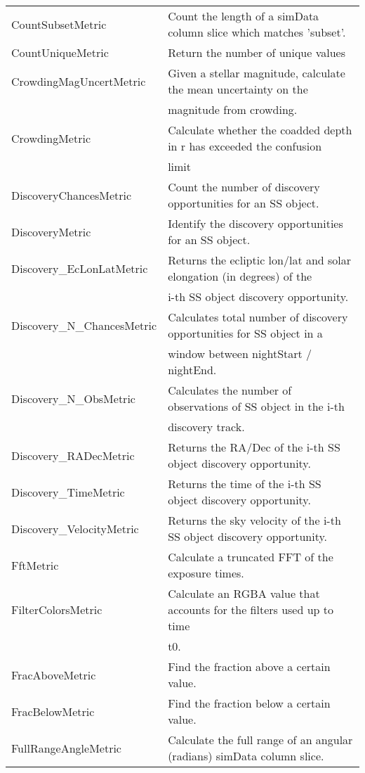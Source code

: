 \begin{table}
\begin{tabular}{ll}
 CountSubsetMetric &  Count the length of a simData column slice which matches 'subset'. \\
 CountUniqueMetric &  Return the number of unique values \\
 CrowdingMagUncertMetric &  Given a stellar magnitude, calculate the mean uncertainty on the \\
  &  magnitude from crowding. \\
 CrowdingMetric &  Calculate whether the coadded depth in r has exceeded the confusion \\
  &  limit \\
 DiscoveryChancesMetric &  Count the number of discovery opportunities for an SS object. \\
 DiscoveryMetric &  Identify the discovery opportunities for an SS object. \\
 Discovery\_EcLonLatMetric &  Returns the ecliptic lon/lat and solar elongation (in degrees) of the \\
  &  i-th SS object discovery opportunity. \\
 Discovery\_N\_ChancesMetric &  Calculates total number of discovery opportunities for SS object in a \\
  &  window between nightStart / nightEnd. \\
 Discovery\_N\_ObsMetric &  Calculates the number of observations of SS object in the i-th \\
  &  discovery track. \\
 Discovery\_RADecMetric &  Returns the RA/Dec of the i-th SS object discovery opportunity. \\
 Discovery\_TimeMetric &  Returns the time of the i-th SS object discovery opportunity. \\
 Discovery\_VelocityMetric &  Returns the sky velocity of the i-th SS object discovery opportunity. \\
 FftMetric &  Calculate a truncated FFT of the exposure times. \\
 FilterColorsMetric &  Calculate an RGBA value that accounts for the filters used up to time \\
  &  t0. \\
 FracAboveMetric &  Find the fraction above a certain value. \\
 FracBelowMetric &  Find the fraction below a certain value. \\
 FullRangeAngleMetric &  Calculate the full range of an angular (radians) simData column slice. \\
\hline
\end{tabular}

\end{table}

